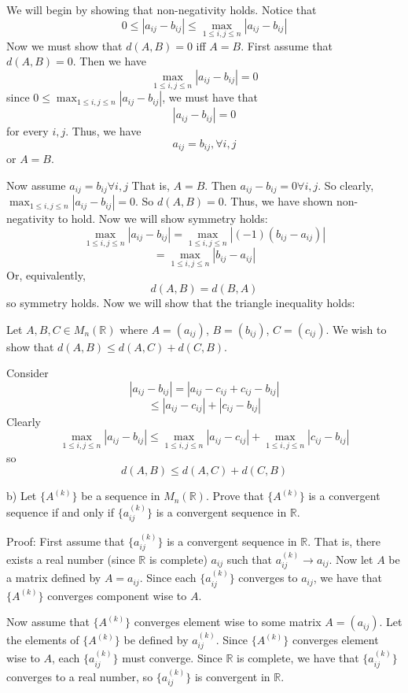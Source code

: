 \documentclass{article}
\begin{document}
\begin{enumerate}
    We will begin by showing that non-negativity holds. Notice that
    \[0 \leq |a_{ij} - b_{ij}| \leq \max_{1 \leq i,j \leq n}|a_{ij} - b_{ij}|\]
    Now we must show that $d(A,B) = 0$ iff $A = B$. First assume that $d(A,B) = 0$. Then we have
    \[\max_{1 \leq i,j \leq n}|a_{ij} - b_{ij}| = 0\]
    since $0 \leq \max_{1 \leq i,j \leq n}|a_{ij} - b_{ij}|$, we must have that
    \[|a_{ij} - b_{ij}| = 0\]
    for every $i,j$. Thus, we have
    \[a_{ij} = b_{ij}, \forall i,j\]
    or $A = B$.
    
    
    Now assume  $a_{ij} = b_{ij} \forall i,j$ That is, $A = B$. Then $a_{ij} - b_{ij} = 0 \forall i,j$. So clearly, $\max_{1 \leq i,j \leq n}|a_{ij} - b_{ij}| = 0$. So $d(A,B) = 0$. Thus, we have shown non-negativity to hold. Now we will show symmetry holds:
    \[\max_{1 \leq i,j \leq n}|a_{ij} - b_{ij}| = \max_{1 \leq i,j \leq n}|(-1)(b_{ij} - a_{ij})|\]
    \[ = \max_{1 \leq i,j \leq n}|b_{ij} - a_{ij}|\]
    Or, equivalently,
    \[d(A,B) = d(B,A)\]
    so symmetry holds. Now we will show that the triangle inequality holds:
    
    Let $A,B,C \in M_n(\mathbb{R})$ where $A = (a_{ij})$, $B = (b_{ij})$, $C = (c_{ij})$. We wish to show that $d(A,B) \leq d(A,C) + d(C,B)$.
    
    Consider
    \[|a_{ij} - b_{ij}| = |a_{ij} - c_{ij} + c_{ij} - b_{ij}|\]
    \[\leq |a_{ij} - c_{ij}| + |c_{ij} - b_{ij}|\]
    Clearly
    \[\max_{1 \leq i,j \leq n}|a_{ij} - b_{ij}| \leq \max_{1 \leq i,j \leq n} |a_{ij} - c_{ij}| + \max_{1 \leq i,j \leq n}|c_{ij} - b_{ij}|\]
    so
    \[d(A,B) \leq d(A,C) + d(C,B)\]
    
    b) Let $\{A^{(k)}\}$ be a sequence in $M_n(\mathbb{R})$. Prove that $\{A^{(k)}\}$ is a convergent sequence if and only if $\{a_{ij}^{(k)}\}$ is a convergent sequence in $\mathbb{R}$.
    
    Proof: First assume that $\{a_{ij}^{(k)}\}$ is a convergent sequence in $\mathbb{R}$. That is, there exists a real number (since $\mathbb{R}$ is complete) $a_{ij}$ such that $a_{ij}^{(k)} \to a_{ij}$. Now let $A$ be a matrix defined by $A = a_{ij}$. Since each $\{a_{ij}^{(k)}\}$ converges to $a_{ij}$, we have that $\{A^{(k)}\}$ converges component wise to $A$. 
    
    Now assume that $\{A^{(k)}\}$ converges element wise to some matrix $A = (a_{ij})$. Let the elements of $\{A^{(k)}\}$ be defined by $a_{ij}^{(k)}$. Since $\{A^{(k)}\}$ converges element wise to $A$, each $\{a_{ij}^{(k)}\}$ must converge. Since $\mathbb{R}$ is complete, we have that $\{a_{ij}^{(k)}\}$ converges to a real number, so $\{a_{ij}^{(k)}\}$ is convergent in $\mathbb{R}$.
    

\end{enumerate}
\end{document}
